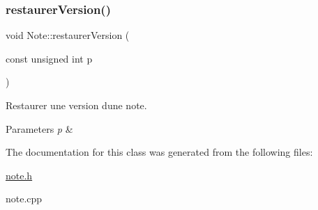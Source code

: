 \subsubsection{\texorpdfstring{restaurer\+Version()}{restaurerVersion()}}
{\footnotesize\ttfamily void Note\+::restaurer\+Version (\begin{DoxyParamCaption}\item[{const unsigned int}]{p }\end{DoxyParamCaption})}



Restaurer une version d\textquotesingle{}une note. 


\begin{DoxyParams}{Parameters}
{\em p} & \\
\hline
\end{DoxyParams}


The documentation for this class was generated from the following files\+:\begin{DoxyCompactItemize}
\item 
\hyperlink{note_8h}{note.\+h}\item 
note.\+cpp\end{DoxyCompactItemize}
